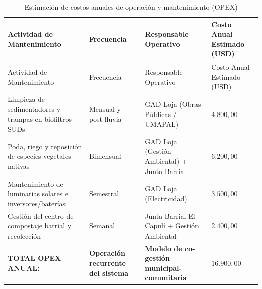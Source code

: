\documentclass[
  spanish,
  letterpaper,
  DIV=11,
  numbers=noendperiod]{scrartcl}
\begin{document}
\begin{longtable}[]{@{}
  >{\raggedright\arraybackslash}p{}
  >{\raggedright\arraybackslash}p{}
  >{\raggedright\arraybackslash}p{}
  >{\centering\arraybackslash}p{}@{}}
\caption{Estimación de costos anuales de operación y mantenimiento
(OPEX)}\label{tbl-opex}\tabularnewline
\toprule\noalign{}
\begin{minipage}[b]{\linewidth}\raggedright
Actividad de Mantenimiento
\end{minipage} & \begin{minipage}[b]{\linewidth}\raggedright
Frecuencia
\end{minipage} & \begin{minipage}[b]{\linewidth}\raggedright
Responsable Operativo
\end{minipage} & \begin{minipage}[b]{\linewidth}\centering
Costo Anual Estimado (USD)
\end{minipage} \\
\midrule\noalign{}
\endfirsthead
\toprule\noalign{}
\begin{minipage}[b]{\linewidth}\raggedright
Actividad de Mantenimiento
\end{minipage} & \begin{minipage}[b]{\linewidth}\raggedright
Frecuencia
\end{minipage} & \begin{minipage}[b]{\linewidth}\raggedright
Responsable Operativo
\end{minipage} & \begin{minipage}[b]{\linewidth}\centering
Costo Anual Estimado (USD)
\end{minipage} \\
\midrule\noalign{}
\endhead
\bottomrule\noalign{}
\endlastfoot
Limpieza de sedimentadores y trampas en biofiltros SUDs & Mensual y
post-lluvia & GAD Loja (Obras Públicas / UMAPAL) & \(4.800,00\) \\
Poda, riego y reposición de especies vegetales nativas & Bimensual & GAD
Loja (Gestión Ambiental) + Junta Barrial & \(6.200,00\) \\
Mantenimiento de luminarias solares e inversores/baterías & Semestral &
GAD Loja (Electricidad) & \(3.500,00\) \\
Gestión del centro de compostaje barrial y recolección & Semanal & Junta
Barrial El Capulí + Gestión Ambiental & \(2.400,00\) \\
\textbf{TOTAL OPEX ANUAL:} & \textbf{Operación recurrente del sistema} &
\textbf{Modelo de co-gestión municipal-comunitaria} &
\textbf{\(16.900,00\)} \\
\end{longtable}
\end{document}
